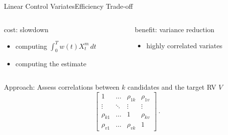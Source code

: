 \documentclass[10pt]{beamer}
\newcommand{\bottomcite}[1]{\vspace*{\fill} {\scriptsize \parencite{#1}}}
\begin{document}
\begin{frame}{Linear Control Variates}{Efficiency Trade-off}
    \begin{columns}
        \begin{column}{.5\textwidth}
            \begin{block}{cost: slowdown}
                \vspace{1ex}
                \begin{center}
                \end{center}
                \begin{itemize}
                    \item computing $\int_{0}^T w(t)X_t^m\,dt$
                    \item computing the estimate
                \end{itemize}
            \end{block}
        \end{column}
        \begin{column}{.5\textwidth}
            \begin{block}{benefit: variance reduction}
                \vspace{1ex}
                \begin{center}
                \end{center}
                \begin{itemize}
                    \item highly correlated variates
                \end{itemize}
            \end{block}
        \end{column}
    \end{columns}
    \vspace{1em}
        Approach: Assess correlations between $k$ candidates and the target RV $V$
        \[
\begin{bmatrix}
1 & \dots & \rho_{1k} & \rho_{1v} \\
\vdots & \ddots & \vdots & \vdots \\
\rho_{k1} & \dots & 1 & \rho_{kv} \\
\rho_{v1} & \dots & \rho_{vk} & 1
\end{bmatrix}\,.
        \]
    \bottomcite{backenkohler2019control,backenkohler2021variance}
\end{frame}
\end{document}
